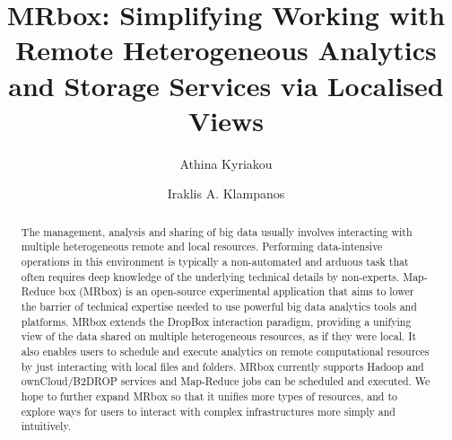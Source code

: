 \documentclass[sigconf,edbt]{acmart-edbt2021}
\begin{document}
\title{MRbox: Simplifying Working with Remote Heterogeneous Analytics and Storage Services via Localised Views}

\author{Athina Kyriakou}

\author{Iraklis A. Klampanos}

\begin{abstract}
The management, analysis and sharing of big data usually involves interacting with multiple heterogeneous remote and local resources. Performing data-intensive operations in this environment is typically a non-automated and arduous task that often requires deep knowledge of the underlying technical details by non-experts. Map-Reduce box (MRbox) is an open-source experimental application that aims to lower the barrier of technical expertise needed to use powerful big data analytics tools and platforms. MRbox extends the DropBox interaction paradigm, providing a unifying view of the data shared on multiple heterogeneous resources, as if they were local. It also enables users to schedule and execute analytics on remote computational resources by just interacting with local files and folders. MRbox currently supports Hadoop and ownCloud/B2DROP services and Map-Reduce jobs can be scheduled and executed. We hope to further expand MRbox so that it unifies more types of resources, and to explore ways for users to interact with complex infrastructures more simply and intuitively.
\end{abstract}

\maketitle





\end{document}
